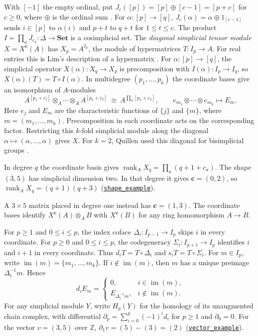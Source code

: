 \documentclass[11pt]{article}
\theoremstyle{definition}
\theoremstyle{remark}
\DeclareMathOperator{\im}{im}
\DeclareMathOperator{\rank}{rank}
\newcommand{\program}[2]{\href{https://github.com/flengyel/SimplicialTensors/blob/c6802c6692215b688864dc18cd9ff3073b804d71/#1}{\nolinkurl{#2}}}
\begin{document}
With $[-1]$ the empty ordinal, put $J_c([p])=[p]\oplus[c-1]=[p+c]$
for $c\geq0$, where $\oplus$ is the ordinal sum \cite[Ch.~VII, \S5, p.~175]{MacLaneCategories}.
For $\alpha:[p]\to[q]$,
$J_c(\alpha)=\alpha\oplus 1_{[c-1]}$ sends $i\in[p]$
to $\alpha(i)$ and $p+t$ to $q+t$ for $1\leq t\leq c$.
The product $I=\prod_a J_{c_a}:\Delta\to\mathbf{Set}$ is a cosimplicial set.
The \emph{diagonal simplicial tensor module} $X=X^{\mathbf c}(A)$ has
$X_p=A^{I_p}$, the module of hypermatrices $T:I_p\to A$.
For real entries this is Lim's description of a hypermatrix \cite[Example~4.5, (4.17)]{Lim2021}.
For $\alpha:[p]\to[q]$, the simplicial operator $X(\alpha):X_q\to X_p$ is precomposition
with $I(\alpha):I_p\to I_q$, so $X(\alpha)(T)=T\circ I(\alpha)$.
In multidegree $(p_1,\ldots,p_k)$ the coordinate bases give an isomorphism of $A$-modules
\[
 A^{[p_1+c_1]}\otimes_A\cdots\otimes_A A^{[p_k+c_k]}
 \ \cong\ A^{\prod_a[p_a+c_a]},\qquad
 e_{m_1}\otimes\cdots\otimes e_{m_k}\longmapsto E_m.
\]
Here $e_j$ and $E_m$ are the characteristic functions of $\{j\}$ and
$\{m\}$, where $m=(m_1,\ldots,m_k)$. Precomposition in each coordinate acts on the
corresponding factor. Restricting this $k$-fold simplicial module along the diagonal $\alpha\mapsto(\alpha,\ldots,\alpha)$
gives $X$. For $k=2$, Quillen used this diagonal for bisimplicial groups \cite{Quillen1966}.

In degree $q$ the coordinate basis gives $\rank_A X_q=\prod_a(q+1+c_a)$.
The shape $(3,5)$ has simplicial dimension two. In that degree it gives
$\mathbf c=(0,2)$, so $\rank_A X_q=(q+1)(q+3)$
(\program{tex/anc/dstm_examples.py\#L25}{shape_example}).

A $3\times5$ matrix placed in degree one instead has $\mathbf c=(1,3)$.
The coordinate bases identify $X^{\mathbf c}(A)\otimes_A B$ with
$X^{\mathbf c}(B)$ for any ring homomorphism $A\to B$.

For $p\geq1$ and $0\leq i\leq p$, the index coface
$\Delta_i:I_{p-1}\to I_p$ skips $i$ in every coordinate.
For $p\geq0$ and $0\leq i\leq p$, the codegeneracy
$\Sigma_i:I_{p+1}\to I_p$ identifies $i$ and $i+1$ in every coordinate. Thus $d_iT=T\circ\Delta_i$ and
$s_iT=T\circ\Sigma_i$. For $m\in I_p$, write $\im(m)=\{m_1,\ldots,m_k\}$.
If $i\notin\im(m)$, then $m$ has a unique preimage $\Delta_i^{-1}m$. Hence
\begin{equation}\label{eq:face}
 d_iE_m=
 \begin{cases}
 0,&i\in\im(m),\\
 E_{\Delta_i^{-1}m},&i\notin\im(m).
 \end{cases}
\end{equation}
For any simplicial module $Y$, write $H_p(Y)$ for the homology of its
unaugmented chain complex, with differential
$\partial_p=\sum_{i=0}^p(-1)^i d_i$ for $p\geq1$ and $\partial_0=0$.
For the vector $v=(3,5)$ over $\mathbb Z$, $\partial_1 v=(5)-(3)=(2)$
(\program{tex/anc/dstm_examples.py\#L42}{vector_example}).
\end{document}
